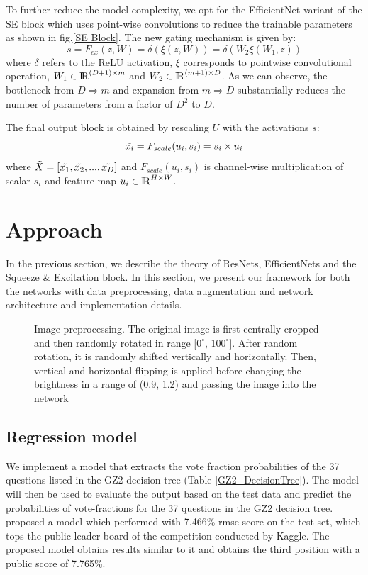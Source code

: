 \documentclass[fleqn,usenatbib]{mnras}
\begin{document}
To further reduce the model complexity, we opt for the EfficientNet variant of the SE block which uses point-wise convolutions to reduce the trainable parameters as shown in fig.\ref{SE Block}. The new gating mechanism is given by:
\begin{equation}
    s = F_{ex}(z, W) = \delta(\xi(z, W)) = \delta(W_2 \xi (W_1, z))
\end{equation}
where $\delta$ refers to the ReLU activation, $\xi$ corresponds to pointwise convolutional operation, $W_1 \in {\rm I\!R}^{(D+1) \times m}$ and $W_2 \in {\rm I\!R}^{(m+1) \times D}$. As we can observe, the bottleneck from $D \Rightarrow m$ and expansion from $m \Rightarrow D$ substantially reduces the number of parameters from a factor of $D^2$ to $D$.

The final output block is obtained by rescaling $U$ with the activations $s$:
\begin{equation}
    \Tilde{x_i} = F_{scale}(u_i,s_i) = s_i \times u_i
\end{equation}
where $\Tilde{X}=[\Tilde{x_1}, \Tilde{x_2}, ...,\Tilde{x_D}]$ and $F_{scale}(u_i,s_i)$ is channel-wise multiplication of scalar $s_i$ and feature map $u_i \in {\rm I\!R}^{H \times W}$.

\section{Approach}
\hspace{0.25 in}In the previous section, we describe the theory of ResNets, EfficientNets and the Squeeze \& Excitation block. In this section, we present our framework for both the networks with data preprocessing, data augmentation and network architecture and implementation details.
\begin{figure}
    \centering
    
    \caption{Image preprocessing. The original image is first centrally cropped and then randomly rotated in range [$0^\circ$, $100^\circ$]. After random rotation, it is randomly shifted vertically and horizontally. Then, vertical and horizontal flipping is applied before changing the brightness in a range of (0.9, 1.2) and passing the image into the network}
    \label{fig: Data_augment}
\end{figure}
\subsection{Regression model}
\hspace{0.25 in}We implement a model that extracts the vote fraction probabilities of the 37 questions listed in the GZ2 decision tree (Table \ref{GZ2_DecisionTree}). The model will then be used to evaluate the output based on the test data and predict the probabilities of vote-fractions for the 37 questions in the GZ2 decision tree. \citet{Dieleman2015} proposed a model which performed with 7.466\% rmse score on the test set, which tops the public leader board of the competition conducted by Kaggle. The proposed model obtains results similar to it and obtains the third position with a public score of 7.765\%. 
\end{document}
